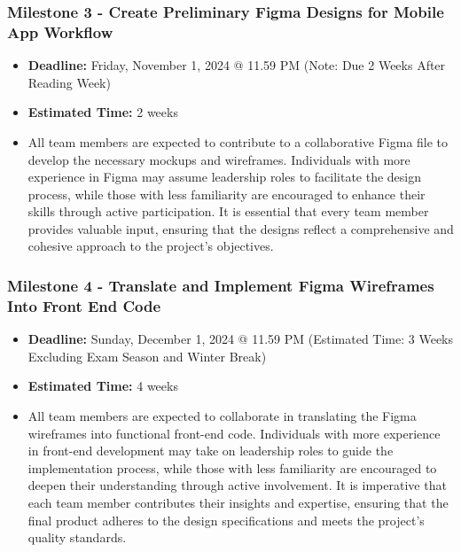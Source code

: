 \documentclass{article}
\begin{document}
\subsubsection*{Milestone 3 - Create Preliminary Figma Designs for Mobile App Workflow}
\begin{itemize}
    \item \textbf{Deadline:} Friday, November 1, 2024 @ 11.59 PM (Note: Due 2
    Weeks After Reading Week)
    \item \textbf{Estimated Time:} 2 weeks
    \item All team members are expected to contribute to a collaborative Figma
    file to develop the necessary mockups and wireframes. Individuals with more
    experience in Figma may assume leadership roles to facilitate the design
    process, while those with less familiarity are encouraged to enhance their
    skills through active participation. It is essential that every team member
    provides valuable input, ensuring that the designs reflect a comprehensive
    and cohesive approach to the project’s objectives.
\end{itemize}

\subsubsection*{Milestone 4 - Translate and Implement Figma Wireframes Into Front End Code}
\begin{itemize}
    \item \textbf{Deadline:} Sunday, December 1, 2024 @ 11.59 PM (Estimated
    Time: 3 Weeks Excluding Exam Season and Winter Break)
    \item \textbf{Estimated Time:} 4 weeks
    \item All team members are expected to collaborate in translating the Figma
    wireframes into functional front-end code. Individuals with more experience
    in front-end development may take on leadership roles to guide the
    implementation process, while those with less familiarity are encouraged to
    deepen their understanding through active involvement. It is imperative that
    each team member contributes their insights and expertise, ensuring that the
    final product adheres to the design specifications and meets the project’s
    quality standards.
\end{itemize}
\end{document}
